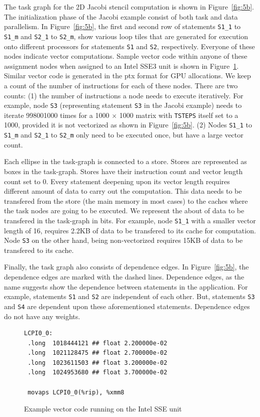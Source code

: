 The task graph for the 2D Jacobi stencil computation is shown in
Figure~\ref{fig:5b}. The initialization phase of the Jacobi example
consist of both task and data parallelism. In Figure~\ref{fig:5b}, the
first and second row of statements \texttt{S1\_1} to \texttt{S1\_m} and
\texttt{S2\_1} to \texttt{S2\_m}, show various loop tiles that are
generated for execution onto different processors for statements
\texttt{S1} and \texttt{S2}, respectively. Everyone of these nodes
indicate vector computations. Sample vector code within anyone of these
assignment nodes when assigned to an Intel SSE3 unit is shown in
Figure~\ref{fig:6}. Similar vector code is generated in the ptx format
for GPU allocations. We keep a count of the number of instructions for
each of these nodes. There are two counts: (1) the number of
instructions a node needs to execute iteratively. For example, node
\texttt{S3} (representing statement \texttt{S3} in the Jacobi example)
needs to iterate 998001000 times for a 1000 $\times$ 1000 matrix with
\texttt{TSTEPS} itself set to a 1000, provided it is not vectorized as
shown in Figure~\ref{fig:5b}. (2) Nodes \texttt{S1\_1} to \texttt{S1\_m} and
\texttt{S2\_1} to \texttt{S2\_m} only need to be executed once, but have
a large vector count.

Each ellipse in the task-graph is connected to a store. Stores are
represented as boxes in the task-graph. Stores have their instruction
count and vector length count set to 0. Every statement deepening upon
its vector length requires different amount of data to carry out the
computation. This data needs to be transfered from the store (the main
memory in most cases) to the caches where the task nodes are going to be
executed. We represent the about of data to be transfered in the
task-graph in bits. For example, node \texttt{S1\_1} with a smaller
vector length of 16, requires 2.2KB of data to be transfered to its
cache for computation. Node \texttt{S3} on the other hand, being
non-vectorized requires 15KB of data to be transfered to its cache.

Finally, the task graph also consists of dependence edges. In
Figure~\ref{fig:5b}, the dependence edges are marked with the dashed
lines. Dependence edges, as the name suggests show the dependence
between statements in the application. For example, statements
\texttt{S1} and \texttt{S2} are independent of each other. But,
statements \texttt{S3} and \texttt{S4} are dependent upon these
aforementioned statements. Dependence edges do not have any weights.

\begin{figure}[h!]
  \centering
\begin{verbatim}
LCPI0_0:
 .long	1018444121 ## float 2.200000e-02
 .long	1021128475 ## float 2.700000e-02
 .long	1023611503 ## float 3.200000e-02
 .long	1024953680 ## float 3.700000e-02

 movaps	LCPI0_0(%rip), %xmm8
\end{verbatim}
  \caption{Example vector code running on the Intel SSE unit}
  \label{fig:6}
\end{figure}




